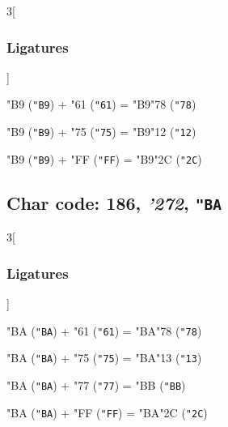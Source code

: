 \documentclass{article}
\newlength{\maxcharwidth}
\begin{document}
\begin{multicols}{3}[\subsubsection{Ligatures}]

{\testfont\char"B9\noboundary} ({\tt"B9}) + {\testfont\char"61\noboundary} ({\tt"61}) = {\testfont\char"B9\noboundary}{\testfont\char"78\noboundary} ({\tt"78}) 

{\testfont\char"B9\noboundary} ({\tt"B9}) + {\testfont\char"75\noboundary} ({\tt"75}) = {\testfont\char"B9\noboundary}{\testfont\char"12\noboundary} ({\tt"12}) 

{\testfont\char"B9\noboundary} ({\tt"B9}) + {\testfont\char"FF\noboundary} ({\tt"FF}) = {\testfont\char"B9\noboundary}{\testfont\char"2C\noboundary} ({\tt"2C}) 

\end{multicols}

\subsection{Char code: 186, {\it'272}, {\tt"BA}}
\label{char_186}


\begin{multicols}{3}[\subsubsection{Ligatures}]

{\testfont\char"BA\noboundary} ({\tt"BA}) + {\testfont\char"61\noboundary} ({\tt"61}) = {\testfont\char"BA\noboundary}{\testfont\char"78\noboundary} ({\tt"78}) 

{\testfont\char"BA\noboundary} ({\tt"BA}) + {\testfont\char"75\noboundary} ({\tt"75}) = {\testfont\char"BA\noboundary}{\testfont\char"13\noboundary} ({\tt"13}) 

{\testfont\char"BA\noboundary} ({\tt"BA}) + {\testfont\char"77\noboundary} ({\tt"77}) = {\testfont\char"BB\noboundary} ({\tt"BB}) 

{\testfont\char"BA\noboundary} ({\tt"BA}) + {\testfont\char"FF\noboundary} ({\tt"FF}) = {\testfont\char"BA\noboundary}{\testfont\char"2C\noboundary} ({\tt"2C}) 

\end{multicols}
\end{document}
